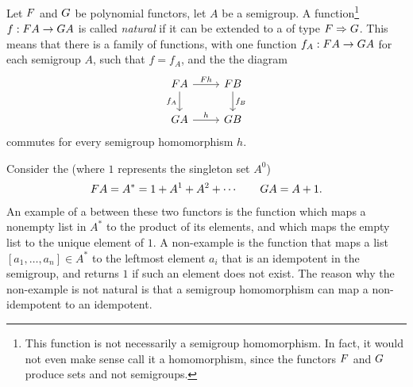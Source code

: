 \begin{definition}\label{def:natural-functions}
    Let $\functor$  and $\functorg$ be polynomial functors, let $A$ be a semigroup. A function\footnote{This function is not necessarily a semigroup homomorphism. In fact, it would not even make sense call it a homomorphism, since the functors $\functor$ and $\functorg$ produce sets and not semigroups.}  $f : \functor A \to \functorg A$ is called \emph{natural} if it can be extended to a  of type $\functor \Rightarrow \functorg$. This means that there is a family of functions, with one function
    $
    f_A : \functor A \to \functorg A
    $
    for each semigroup $A$, such  that $f=f_A$, and the the  diagram
    \[
    \begin{tikzcd}
    \functor A 
    \ar[r,"\functor h"]
    \ar[d,"f_A"']
    & 
    \functor B 
    \ar[d,"f_B"]
    \\
    \functorg A 
    \ar[r,"h"]
    &
    \functorg B
    \end{tikzcd}
    \]
    commutes for every semigroup homomorphism $h$.
\end{definition}


\begin{example}
    Consider the  (where $1$ represents the singleton set $A^0$)
    \begin{align*}
    \functor A = A^* = 1 + A^1 + A^2 + \cdots  \qquad \functorg A = A + 1.     \end{align*} 
An example of a  between these two functors is the function which maps a nonempty list in $A^*$ to the product of its elements, and which maps the empty list to the unique element of $1$. A non-example is the function that maps a list $[a_1,\ldots,a_n] \in A^*$ to the leftmost element $a_i$ that is an idempotent in the semigroup, and returns $1$ if such an element does not exist. The reason why the non-example is not natural is that a semigroup homomorphism can map a non-idempotent to an idempotent.
\end{example}


